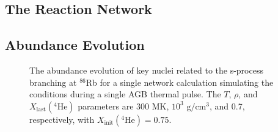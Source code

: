 \subsection{The Reaction Network} \label{subsec:the_reaction_network}


\subsection{Abundance Evolution}


\begin{figure}[t]
\caption{\label{fig:abund_evol}The abundance evolution of key nuclei related to the s-process branching at $^{86}$Rb for a single network calculation simulating the conditions during a single AGB thermal pulse. The $T$, $\rho$, and $X_{\mathrm{last}}(^{4}\mathrm{He})$ parameters are 300 MK, $10^{3}$ $\mathrm{g}/\mathrm{cm}^{3}$, and 0.7, respectively, with $X_{\mathrm{init}}(^{4}\mathrm{He}) = 0.75$.}
\end{figure}

